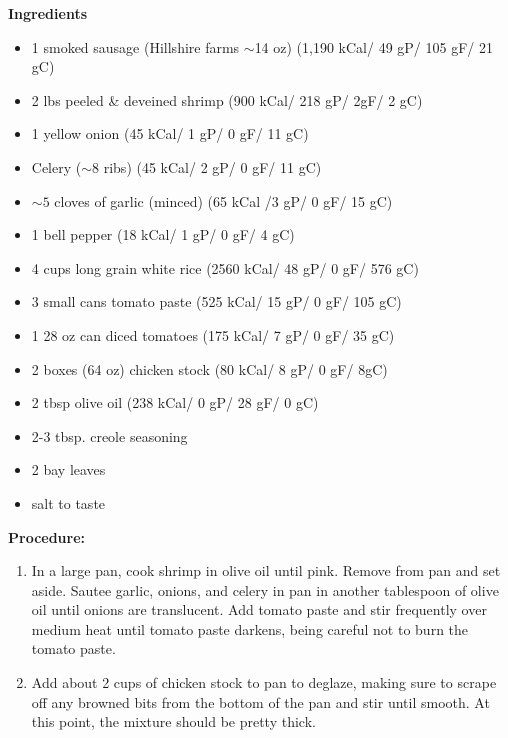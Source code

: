 \bigskip

\bigskip

\begin{multicols}{2}
\textbf{Ingredients}
\begin{itemize}
\item 1 smoked sausage (Hillshire farms $\sim$14 oz) \newline (1,190 kCal/ 49 gP/ 105 gF/ 21 gC)
\item 2 lbs peeled \& deveined shrimp \newline(900 kCal/ 218 gP/ 2gF/ 2 gC)
\item 1 yellow onion \quad (45 kCal/ 1 gP/ 0 gF/ 11 gC)
\item Celery ($\sim$8 ribs) \quad (45 kCal/ 2 gP/ 0 gF/ 11 gC)
\item $\sim 5$ cloves of garlic (minced) (65 kCal /3 gP/ 0 gF/ 15 gC)
\item 1 bell pepper \quad (18 kCal/ 1 gP/ 0 gF/ 4 gC)
\item 4 cups long grain white rice \quad (2560 kCal/ 48 gP/ 0 gF/ 576 gC)
\item 3 small cans tomato paste \quad (525 kCal/ 15 gP/ 0 gF/ 105 gC)
\item 1 28 oz can diced tomatoes \quad (175 kCal/ 7 gP/ 0 gF/ 35 gC)
\item 2 boxes (64 oz) chicken stock \quad (80 kCal/ 8 gP/ 0 gF/ 8gC)
\item 2 tbsp olive oil \quad (238 kCal/ 0 gP/ 28 gF/ 0 gC)
\item 2-3 tbsp. creole seasoning
\item 2 bay leaves 
\item salt to taste





\end{itemize}


\columnbreak
\textbf{Procedure:}
\medskip


\begin{enumerate}
\item In a large pan, cook shrimp in olive oil until pink. Remove from pan and set aside. Sautee garlic, onions, and celery in pan in another tablespoon of olive oil until onions are translucent. Add tomato paste and stir frequently over medium heat until tomato paste darkens, being careful not to burn the tomato paste.


\medskip
\item Add about 2 cups of chicken stock to pan to deglaze, making sure to scrape off any browned bits from the bottom of the pan and stir until smooth. At this point, the mixture should be pretty thick. 
\medskip


\end{enumerate}
\end{multicols}

